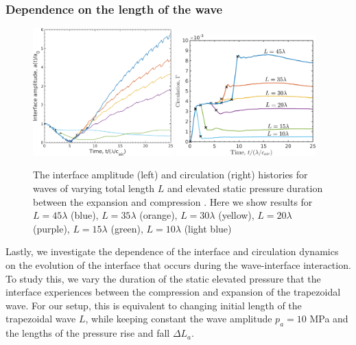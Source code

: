 \subsubsection{Dependence on the length of the wave}%
\begin{figure}[h]
  \centering
  \includegraphics[width=0.48\textwidth]{./figs/lung_figs/interface_multi-lag}
  \includegraphics[width=0.48\textwidth]{./figs/lung_figs/circulation_multi-lag_fixed}
  \caption[The interface and circulation dependence on wave
  duration]{The interface amplitude (left) and circulation (right)
    histories for waves of varying total length $L$ and elevated
    static pressure duration between the expansion and compression
    . Here we show results for $L=45\lambda$ (blue), $L=35\lambda$
    (orange), $L=30\lambda$ (yellow), $L=20\lambda$ (purple),
    $L=15\lambda$ (green), $L=10\lambda$ (light blue)}
  \label{fig:trapz_circ_interface_multi-lag}
\end{figure}
Lastly, we investigate the dependence of the interface and circulation
dynamics on the evolution of the interface that occurs during the
wave-interface interaction. To study this, we vary the duration of the
static elevated pressure that the interface experiences between the
compression and expansion of the trapezoidal wave. For our setup, this
is equivalent to changing initial length of the trapezoidal wave $L$,
while keeping constant the wave amplitude $p_a=10$ MPa and the lengths
of the pressure rise and fall $\Delta L_a$. 

